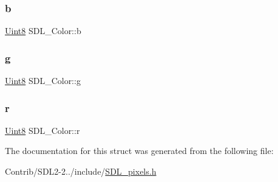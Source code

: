 \subsubsection{\texorpdfstring{b}{b}}
{\footnotesize\ttfamily \mbox{\hyperlink{_s_d_l__stdinc_8h_a2944638813a090aa23e62f4da842c3e2}{Uint8}} S\+D\+L\+\_\+\+Color\+::b}

\mbox{\label{struct_s_d_l___color_ae29d881bf740cfa7078b36e07f85d298}} 
\subsubsection{\texorpdfstring{g}{g}}
{\footnotesize\ttfamily \mbox{\hyperlink{_s_d_l__stdinc_8h_a2944638813a090aa23e62f4da842c3e2}{Uint8}} S\+D\+L\+\_\+\+Color\+::g}

\mbox{\label{struct_s_d_l___color_a0bb975b6829524133fdd3c6060cfa63d}} 
\subsubsection{\texorpdfstring{r}{r}}
{\footnotesize\ttfamily \mbox{\hyperlink{_s_d_l__stdinc_8h_a2944638813a090aa23e62f4da842c3e2}{Uint8}} S\+D\+L\+\_\+\+Color\+::r}



The documentation for this struct was generated from the following file\+:\begin{DoxyCompactItemize}
\item 
Contrib/\+S\+D\+L2-\/2../include/\mbox{\hyperlink{_s_d_l__pixels_8h}{S\+D\+L\+\_\+pixels.\+h}}\end{DoxyCompactItemize}
